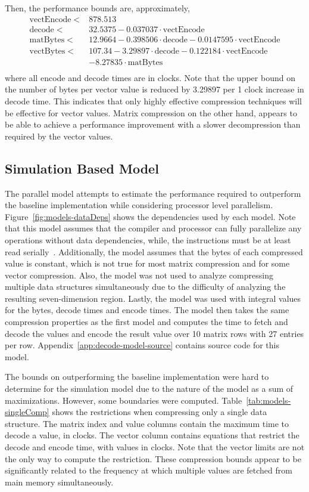Then, the performance bounds are, approximately,
\begin{align*}
\mathrm{vectEncode} <& 878.513 \\
\mathrm{decode} <& 32.5375 - 0.037037\cdot\mathrm{vectEncode} \\
\mathrm{matBytes} <& 12.9664 - 0.398506\cdot\mathrm{decode}- 0.0147595\cdot\mathrm{vectEncode}\\
\mathrm{vectBytes} <& 107.34  - 3.29897\cdot\mathrm{decode} - 0.122184\cdot\mathrm{vectEncode} \\
	&- 8.27835\cdot\mathrm{matBytes}\\
\end{align*}
where all encode and decode times are in clocks.
Note that the upper bound on the number of bytes per vector value is reduced by 3.29897 per 1 clock increase in decode time.
This indicates that only highly effective compression techniques will be effective for vector values.
Matrix compression on the other hand, appears to be able to achieve a performance improvement with a slower decompression than required by the vector values.

\subsection{Simulation Based Model}
The parallel model attempts to estimate the performance required to outperform the baseline implementation while considering processor level parallelism.
Figure~\ref{fig:models-dataDeps} shows the dependencies used by each model.
Note that this model assumes that the compiler and processor can fully parallelize any operations without data dependencies, while, the instructions must be at least read serially~\cite{Hennessy:1990:ComputerArchitecture}.
Additionally, the model assumes that the bytes of each compressed value is constant, which is not true for most matrix compression and for some vector compression.
Also, the model was not used to analyze compressing multiple data structures simultaneously due to the difficulty of analyzing the resulting seven-dimension region.
Lastly, the model was used with integral values for the bytes, decode times and encode times.
The model then takes the same compression properties as the first model and computes the time to fetch and decode the values and encode the result value over 10 matrix rows with 27 entries per row.
Appendix~\ref{app:decode-model-source} contains source code for this model.

The bounds on outperforming the baseline implementation were hard to determine for the simulation model due to the nature of the model as a sum of maximizations.
However, some boundaries were computed.
Table~\ref{tab:models-singleComp} shows the restrictions when compressing only a single data structure.
The matrix index and value columns contain the maximum time to decode a value, in clocks.
The vector column contains equations that restrict the decode and encode time, with values in clocks.
Note that the vector limits are not the only way to compute the restriction.
These compression bounds appear to be significantly related to the frequency at which multiple values are fetched from main memory simultaneously.
